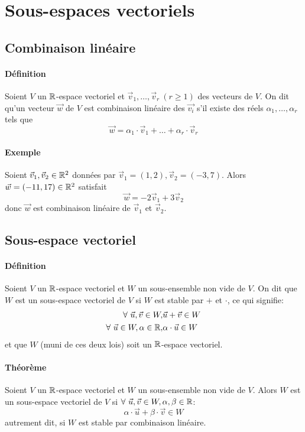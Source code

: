 %
%
\section{Sous-espaces vectoriels}
%
%

%
\subsection{Combinaison linéaire}
%
\paragraph{Définition} Soient $V$ un $\mathbb{R}$-espace vectoriel et $\vec{v}_1, \ldots, \vec{v}_r ~ (r\geq 1)$ des vecteurs de $V$. On dit qu'un vecteur $\vec{w}$ de $V$ est combinaison linéaire des $\vec{v_i}$ s'il existe des réels $\alpha_1, \ldots, \alpha_r$ tels que
$$\vec{w} = \alpha_1 \cdot \vec{v}_1 + \ldots + \alpha_r \cdot \vec{v}_r$$

\paragraph{Exemple} Soient $\vec{v}_1, \vec{v}_2 \in \mathbb{R}^2$ données par $\vec{v}_1 = (1,2), \vec{v}_2 = (-3,7)$. Alors $\vec{w}=(-11,17) \in \mathbb{R}^2$ satisfait 
$$\vec{w} = -2\vec{v}_1 + 3\vec{v}_2$$
donc $\vec{w}$ est combinaison linéaire de $\vec{v}_1$ et $\vec{v}_2$.

%
\subsection{Sous-espace vectoriel}
%
\paragraph{Définition} Soient $V$ un $\mathbb{R}$-espace vectoriel et $W$ un sous-ensemble non vide de $V$. On dit que $W$ est un sous-espace vectoriel de $V$ si $W$ est stable par $+$ et $\cdot$, ce qui signifie:
\begin{eqnarray*}
  \forall ~ \vec{u}, \vec{v} \in W, & \vec{u} + \vec{v} \in W \\
  \forall ~ \vec{u} \in W, \alpha \in \mathbb{R}, & \alpha \cdot \vec{u} \in W \\
\end{eqnarray*}
et que $W$ (muni de ces deux lois) soit un $\mathbb{R}$-espace vectoriel.

\paragraph{Théorème} Soient $V$ un $\mathbb{R}$-espace vectoriel et $W$ un sous-ensemble non vide de $V$. Alors $W$ est un sous-espace vectoriel de $V$ si $\forall ~ \vec{u}, \vec{v} \in W, \alpha, \beta \in \mathbb{R}$:
$$\alpha \cdot \vec{u} + \beta \cdot \vec{v} \in W$$
autrement dit, si $W$ est stable par combinaison linéaire.

